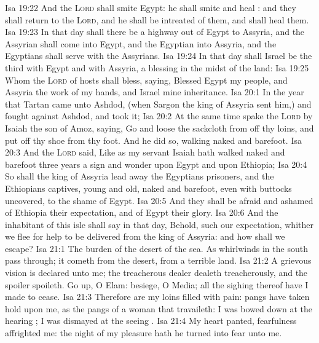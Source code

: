 \vs Isa 19:22 And the \textsc{Lord} shall smite Egypt: he shall smite and heal : and they shall return  to the \textsc{Lord}, and he shall be intreated of them, and shall heal them.
\vs Isa 19:23 In that day shall there be a highway out of Egypt to Assyria, and the Assyrian shall come into Egypt, and the Egyptian into Assyria, and the Egyptians shall serve with the Assyrians.
\vs Isa 19:24 In that day shall Israel be the third with Egypt and with Assyria,  a blessing in the midst of the land:
\vs Isa 19:25 Whom the \textsc{Lord} of hosts shall bless, saying, Blessed  Egypt my people, and Assyria the work of my hands, and Israel mine inheritance.
\vs Isa 20:1 In the year that Tartan came unto Ashdod, (when Sargon the king of Assyria sent him,) and fought against Ashdod, and took it;
\vs Isa 20:2 At the same time spake the \textsc{Lord} by Isaiah the son of Amoz, saying, Go and loose the sackcloth from off thy loins, and put off thy shoe from thy foot. And he did so, walking naked and barefoot.
\vs Isa 20:3 And the \textsc{Lord} said, Like as my servant Isaiah hath walked naked and barefoot three years  a sign and wonder upon Egypt and upon Ethiopia;
\vs Isa 20:4 So shall the king of Assyria lead away the Egyptians prisoners, and the Ethiopians captives, young and old, naked and barefoot, even with  buttocks uncovered, to the shame of Egypt.
\vs Isa 20:5 And they shall be afraid and ashamed of Ethiopia their expectation, and of Egypt their glory.
\vs Isa 20:6 And the inhabitant of this isle shall say in that day, Behold, such  our expectation, whither we flee for help to be delivered from the king of Assyria: and how shall we escape?
\vs Isa 21:1 The burden of the desert of the sea. As whirlwinds in the south pass through;  it cometh from the desert, from a terrible land.
\vs Isa 21:2 A grievous vision is declared unto me; the treacherous dealer dealeth treacherously, and the spoiler spoileth. Go up, O Elam: besiege, O Media; all the sighing thereof have I made to cease.
\vs Isa 21:3 Therefore are my loins filled with pain: pangs have taken hold upon me, as the pangs of a woman that travaileth: I was bowed down at the hearing ; I was dismayed at the seeing .
\vs Isa 21:4 My heart panted, fearfulness affrighted me: the night of my pleasure hath he turned into fear unto me.
